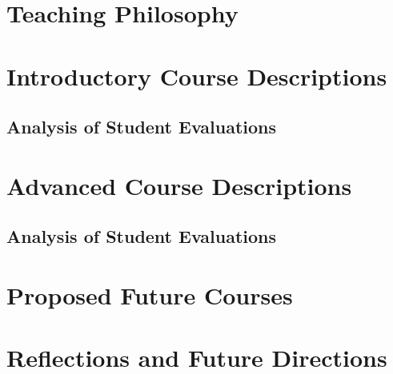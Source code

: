 \documentclass[../main.tex]{subfiles}
\begin{document}
\section{Teaching Philosophy}

\begin{flushleft}

\end{flushleft}

\section{Introductory Course Descriptions}

\begin{flushleft}

\end{flushleft}

\subsection{Analysis of Student Evaluations}

\begin{flushleft}

\end{flushleft}

\section{Advanced Course Descriptions}

\begin{flushleft}

\end{flushleft}

\subsection{Analysis of Student Evaluations}

\begin{flushleft}

\end{flushleft}

\section{Proposed Future Courses}

\begin{flushleft}

\end{flushleft}

\section{Reflections and Future Directions}

\begin{flushleft}

\end{flushleft}
\end{document}
